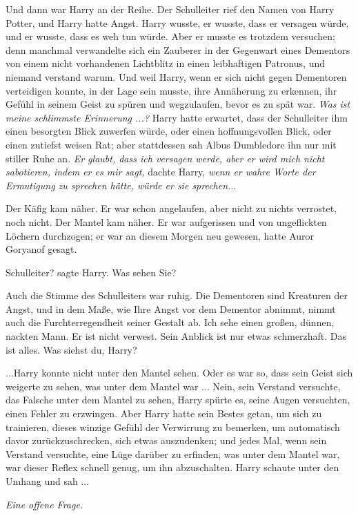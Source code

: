 Und dann war Harry an der Reihe. Der Schulleiter rief den Namen von Harry
Potter, und Harry hatte Angst. Harry wusste, er wusste, dass er versagen würde,
und er wusste, dass es weh tun würde. Aber er musste es trotzdem versuchen; denn
manchmal verwandelte sich ein Zauberer in der Gegenwart eines Dementors von
einem nicht vorhandenen Lichtblitz in einen leibhaftigen Patronus, und niemand
verstand warum. Und weil Harry, wenn er sich nicht gegen Dementoren verteidigen
konnte, in der Lage sein musste, ihre Annäherung zu erkennen, ihr Gefühl in
seinem Geist zu spüren und wegzulaufen, bevor es zu spät war. \emph{ Was ist
meine schlimmste Erinnerung ...?} Harry hatte erwartet, dass der Schulleiter ihm
einen besorgten Blick zuwerfen würde, oder einen hoffnungsvollen Blick, oder
einen zutiefst weisen Rat; aber stattdessen sah Albus Dumbledore ihn nur mit
stiller Ruhe an. \emph{ Er glaubt, dass ich versagen werde, aber er wird mich
nicht sabotieren, indem er es mir sagt,} dachte Harry, \emph{wenn er wahre Worte
der Ermutigung zu sprechen hätte, würde er sie sprechen.}..

Der Käfig kam näher. Er war schon angelaufen, aber nicht zu nichts verrostet,
noch nicht. Der Mantel kam näher. Er war aufgerissen und von ungeflickten
Löchern durchzogen; er war an diesem Morgen neu gewesen, hatte Auror Goryanof
gesagt.

\glqq{}Schulleiter?\grqq{} sagte Harry. \glqq{}Was sehen Sie?\grqq{}

Auch die Stimme des Schulleiters war ruhig. \glqq{}Die Dementoren sind Kreaturen
der Angst, und in dem Maße, wie Ihre Angst vor dem Dementor abnimmt, nimmt auch
die Furchterregendheit seiner Gestalt ab. Ich sehe einen großen, dünnen, nackten
Mann. Er ist nicht verwest. Sein Anblick ist nur etwas schmerzhaft. Das ist
alles. Was siehst du, Harry?\grqq{}

...Harry konnte nicht unter den Mantel sehen. Oder es war so, dass sein Geist
sich weigerte zu sehen, was unter dem Mantel war ... Nein, sein Verstand
versuchte, das Falsche unter dem Mantel zu sehen, Harry spürte es, seine Augen
versuchten, einen Fehler zu erzwingen. Aber Harry hatte sein Bestes getan, um
sich zu trainieren, dieses winzige Gefühl der Verwirrung zu bemerken, um
automatisch davor zurückzuschrecken, sich etwas auszudenken; und jedes Mal, wenn
sein Verstand versuchte, eine Lüge darüber zu erfinden, was unter dem Mantel
war, war dieser Reflex schnell genug, um ihn abzuschalten. Harry schaute unter
den Umhang und sah ...

\emph{Eine offene Frage.}

